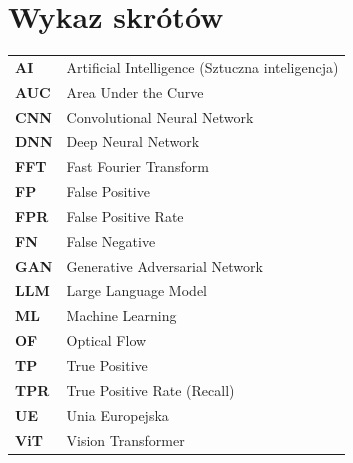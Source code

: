 \documentclass[pl,12pt,openany]{TAGH/t_agh_av}
\begin{document}
\chapter*{Wykaz skr\'{o}t\'{o}w}
\begin{tabular}{ll}
\textbf{AI}    & Artificial Intelligence (Sztuczna inteligencja) \\
\textbf{AUC}   & Area Under the Curve \\
\textbf{CNN}   & Convolutional Neural Network \\
\textbf{DNN}   & Deep Neural Network \\
\textbf{FFT}   & Fast Fourier Transform \\
\textbf{FP}    & False Positive \\
\textbf{FPR}   & False Positive Rate \\
\textbf{FN}    & False Negative \\
\textbf{GAN}   & Generative Adversarial Network \\
\textbf{LLM}   & Large Language Model \\
\textbf{ML}    & Machine Learning \\
\textbf{OF}    & Optical Flow \\
\textbf{TP}    & True Positive \\
\textbf{TPR}   & True Positive Rate (Recall) \\
\textbf{UE}    & Unia Europejska \\
\textbf{ViT}   & Vision Transformer \\
\end{tabular}








\printbibliography[heading=bibintoc, title={Bibliografia}]
\end{document}
